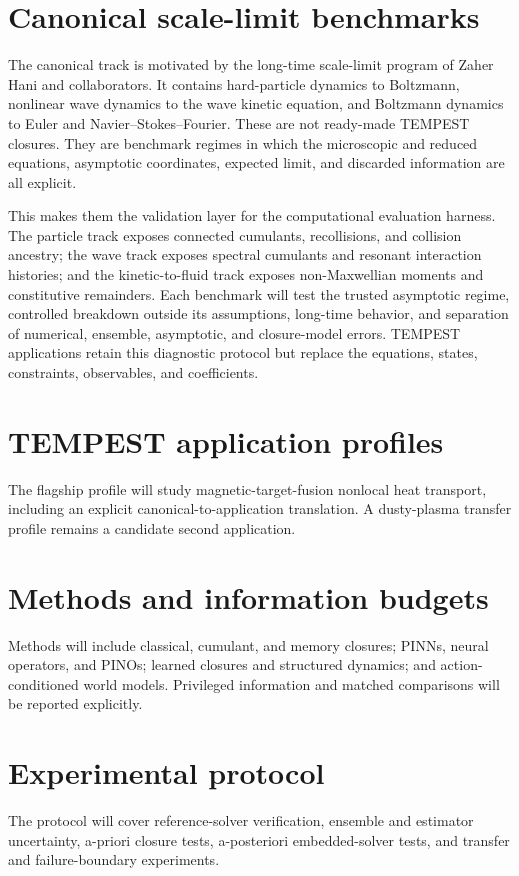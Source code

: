 \documentclass[11pt]{article}
\begin{document}
\section{Canonical scale-limit benchmarks}
The canonical track is motivated by the long-time scale-limit program of
Zaher Hani and collaborators. It contains hard-particle dynamics to
Boltzmann, nonlinear wave dynamics to the wave kinetic equation, and
Boltzmann dynamics to Euler and Navier--Stokes--Fourier. These are not
ready-made TEMPEST closures. They are benchmark regimes in which the
microscopic and reduced equations, asymptotic coordinates, expected limit,
and discarded information are all explicit.

This makes them the validation layer for the computational evaluation
harness. The particle track exposes connected cumulants, recollisions, and
collision ancestry; the wave track exposes spectral cumulants and resonant
interaction histories; and the kinetic-to-fluid track exposes
non-Maxwellian moments and constitutive remainders. Each benchmark will test
the trusted asymptotic regime, controlled breakdown outside its assumptions,
long-time behavior, and separation of numerical, ensemble, asymptotic, and
closure-model errors. TEMPEST applications retain this diagnostic protocol
but replace the equations, states, constraints, observables, and coefficients.

\section{TEMPEST application profiles}
The flagship profile will study magnetic-target-fusion nonlocal heat
transport, including an explicit canonical-to-application translation. A
dusty-plasma transfer profile remains a candidate second application.

\section{Methods and information budgets}
Methods will include classical, cumulant, and memory closures; PINNs, neural
operators, and PINOs; learned closures and structured dynamics; and
action-conditioned world models. Privileged information and matched
comparisons will be reported explicitly.

\section{Experimental protocol}
The protocol will cover reference-solver verification, ensemble and estimator
uncertainty, a-priori closure tests, a-posteriori embedded-solver tests, and
transfer and failure-boundary experiments.
\end{document}
